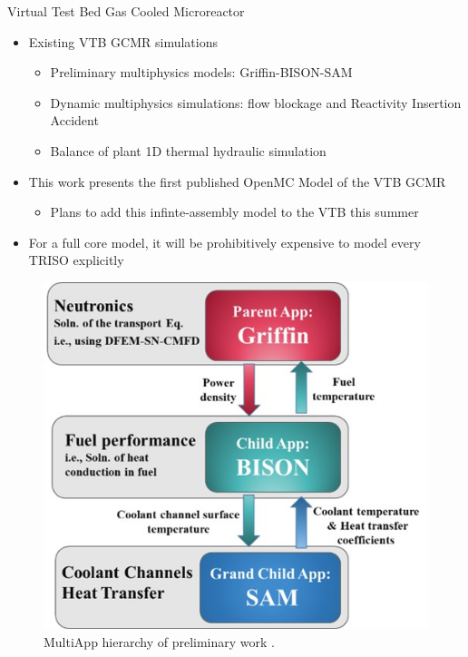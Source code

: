 \documentclass[9pt,t,aspectratio=169]{beamer}
\begin{document}
\begin{frame}{Virtual Test Bed Gas Cooled Microreactor}
    \begin{minipage}[t]{0.45\linewidth}
        \begin{itemize}
            \item Existing VTB GCMR simulations
            \begin{itemize}
                \item Preliminary multiphysics models: Griffin-BISON-SAM \cite{Abdelhameed-ANS-2022,Stauff-preliminary-applications-2021,Stauff-applications-2022}
                \item Dynamic multiphysics simulations: flow blockage and Reactivity Insertion Accident \cite{HF_MRs_ANL}
                \item Balance of plant 1D thermal hydraulic simulation \cite{Duchnowski_plant_balance_2022}
            \end{itemize}
            \item This work presents the first published OpenMC Model of the VTB GCMR
            \begin{itemize}
                \item Plans to add this infinte-assembly model to the VTB this summer
            \end{itemize}
            \item For a full core model, it will be prohibitively expensive to model every TRISO explicitly
        \end{itemize}
    \end{minipage}
    \hfill%
    \begin{minipage}[t]{0.45\linewidth}
        \begin{figure}
            \centering
            \includegraphics[width=0.9\linewidth]{figures/gcmr_preliminary_mutliapps.png}
            \caption{MultiApp hierarchy of preliminary work \cite{Abdelhameed-ANS-2022}.}
        \end{figure}
    \end{minipage}

\end{frame}
\end{document}
